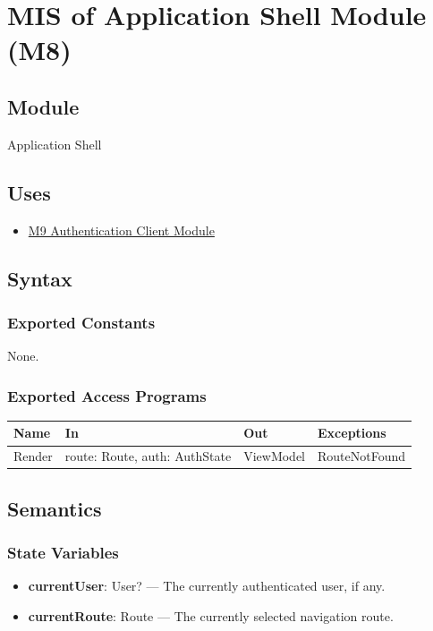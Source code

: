\documentclass[12pt, titlepage]{article}
\begin{document}
\newpage
\section{MIS of Application Shell Module (M8)}\label{sec:app-shell-module}

\subsection{Module}
Application Shell

\subsection{Uses}
\begin{itemize}
    \item \hyperref[sec:authentication-client-module]{M9 Authentication Client Module}
\end{itemize}

\subsection{Syntax}

\subsubsection{Exported Constants}
None.

\subsubsection{Exported Access Programs}

\begin{center}
    \begin{tabular}{p{4.5cm} p{4.5cm} p{3.5cm} p{3.5cm}}
        \toprule
        \textbf{Name} & \textbf{In} & \textbf{Out} & \textbf{Exceptions} \\
        \midrule
        Render & route: Route, auth: AuthState & ViewModel & RouteNotFound \\
        \bottomrule
    \end{tabular}
\end{center}

\subsection{Semantics}

\subsubsection{State Variables}
\begin{itemize}
    \item \textbf{currentUser}: User? --- The currently authenticated user, if any.
    \item \textbf{currentRoute}: Route --- The currently selected navigation route.
\end{itemize}
\end{document}
